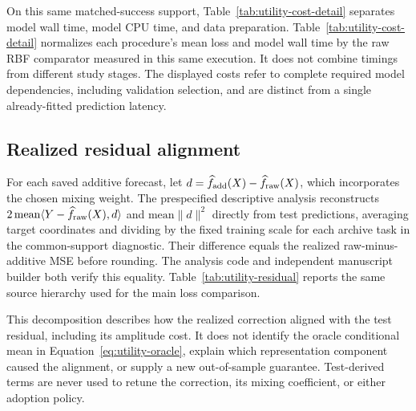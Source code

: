 On this same matched-success support,
Table~\ref{tab:utility-cost-detail} separates model wall time, model CPU
time, and data preparation. Table~\ref{tab:utility-cost-detail}
normalizes each procedure's mean loss and model wall time by the raw
RBF comparator measured in this same execution. It does not combine
timings from different study stages. The displayed costs refer to
complete required model dependencies, including validation selection,
and are distinct from a single already-fitted prediction latency.



\FloatBarrier

\subsection{Realized residual alignment}
\label{app:utility-residual-results}

For each saved additive forecast, let
$d=\widehat f_{\rm add}(X)-\widehat f_{\rm raw}(X)$, which incorporates
the chosen mixing weight. The prespecified descriptive analysis
reconstructs $2\,\mathrm{mean}\langle Y-\widehat f_{\rm raw}(X),d\rangle$
and $\mathrm{mean}\|d\|^2$ directly from test predictions, averaging
target coordinates and dividing by the fixed training scale for each
archive task in the common-support diagnostic. Their difference equals the realized raw-minus-additive
MSE before rounding. The analysis code and independent manuscript
builder both verify this equality. Table~\ref{tab:utility-residual}
reports the same source hierarchy used for the main loss comparison.

This decomposition describes how the realized correction aligned with
the test residual, including its amplitude cost. It does not identify the
oracle conditional mean in Equation~\eqref{eq:utility-oracle}, explain
which representation component caused the alignment, or supply a new
out-of-sample guarantee. Test-derived terms are never used to retune
the correction, its mixing coefficient, or either adoption policy.


